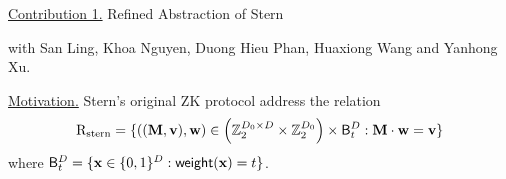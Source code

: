 \begin{frame}{}
	\underline{Contribution 1.} Refined Abstraction of Stern
	
	with San Ling, Khoa Nguyen, Duong Hieu Phan, Huaxiong Wang and Yanhong Xu.
	
	\underline{Motivation.} Stern's original ZK protocol address the relation 
	\begin{equation*}
		\mathrm{R}_{\mathrm{stern}} = \{((\mathbf{M},\mathbf{v}), \mathbf{w}) \in \left(\mathbb{Z}_2^{D_0\times D}\times \mathbb{Z}_2^{D_0}\right)\times \mathsf{B}^D_t : \mathbf{M}\cdot\mathbf{w} = \mathbf{v}\}
	\end{equation*}
	where $\mathsf{B}^D_t = \{\mathbf{x} \in \{0,1\}^D : \mathsf{weight}(\mathbf{x}) = t\}$.
\end{frame}